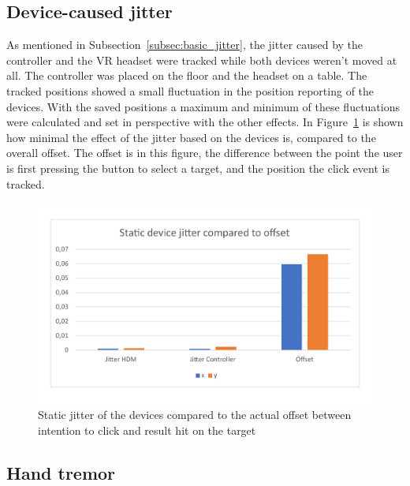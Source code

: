 \subsection{Device-caused jitter}
\label{subsec:evaluation:clearing_the_data:device_caused_jitter}

As mentioned in Subsection~\ref{subsec:basic_jitter}, the jitter caused by the controller and the VR headset were tracked while both devices weren't moved at all. The controller was placed on the floor and the headset on a table. The tracked positions showed a small fluctuation in the position reporting of the devices. With the saved positions a maximum and minimum of these fluctuations were calculated and set in perspective with the other effects. In Figure~\ref{fig:static_device_jitter_compared_to_offset} is shown how minimal the effect of the jitter based on the devices is, compared to the overall offset. The offset is in this figure, the difference between the point the user is first pressing the button to select a target, and the position the click event is tracked.

\begin{figure}[h]
    \centering
    \includegraphics[width=.9\columnwidth]{graphics/graphs/static_device_jitter_compared_to_offset.pdf}
    \caption{Static jitter of the devices compared to the actual offset between intention to click and result hit on the target}
    \label{fig:static_device_jitter_compared_to_offset}
\end{figure}

\subsection{Hand tremor}
\label{subsec:evaluation:clearing_the_data:hand_tremor}


